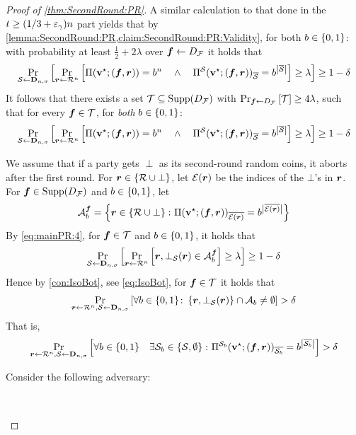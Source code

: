 \begin{proof}[Proof of \cref{thm:SecondRound:PR}]
A similar  calculation to that done in the  $t\ge (1/3 + \epg)n$ part  yields that by \cref{lemma:SecondRound:PR,claim:SecondRound:PR:Validity},  for both $\o\in \zo$:  with probability at least  $\frac12 + 2\lambda$ over  $\vf \gets \DF $ it holds that
\begin{align*}
\ppr{\cs \gets \bns}{\ppr{\vr \gets \rn}{\Pi(\vstar;(\vf,\vr)) = \o^n \qand \Pi^\cs(\vstar;(\vf,\vr))_\oS = \o^{\size{\oS}} } \ge  \lambda}\ge 1-\delta
\end{align*}
It follows that there exists a set $\cT \subseteq \SDF$ with $\ppr{\vf \gets \DF}{\cT}\ge 4\lambda$, such that  for every $\vf\in \cT$, for \emph{both} $\o\in \zo$:
\begin{align}\label{eq:mainPR:4}
\ppr{\cs \gets \bns}{\ppr{\vr \gets \rn}{\Pi(\vstar;(\vf,\vr)) = \o^n \qand \Pi^\cs(\vstar;(\vf,\vr))_\oS = \o^{\size{\oS}} } \ge \lambda}\ge 1-\delta
\end{align}

We  assume \wlg that if a party gets $\perp$ as its second-round random coins, it aborts after the first round. For $\vr \in \rbot$, let $ \cE(\vr)$ be the indices of the $\bot$'s in $\vr$. For $\vf \in \SDF$ and $\o \in \zo$, let
\begin{align}
\cA^\vf_\o = \set{\vr \in \rbot \colon \Pi(\vstar;(\vf,\vr))_{\overline{\cE(\vr)}} = \o^{\size{\overline{\cE(\vr)}}}}
\end{align}
By \cref{eq:mainPR:4},  for $\vf \in \cT$ and $\o\in \zo$, it holds that
\begin{align}
\ppr{\cs\gets \bns}{\ppr{\vr \gets \rn}{\vr,\bot_{\cS}(\vr) \in \cA^\vf_\o} \ge\lambda} \ge 1-\delta
\end{align}
Hence by \cref{con:IsoBot},  see  \cref{eq:IsoBot}, for  $\vf \in \cT$ it holds that
\begin{align*}
\ppr{\vr\gets \rn,\cS \gets \bns}{\forall \o \in \zo\colon   \set{\vr,\bot_{\cS}(\vr)}\cap \cA_b \neq \emptyset} > \delta
\end{align*}
That is,
\begin{align}\label{eq:PR:3}
\ppr{\vr\gets \cR^n,\cS \gets \bns}{\forall \o\in \zo  \quad \exists \cs_\o \in \set{\cs,\emptyset} \colon  \Pi^{\cS_\o}(\vstar;(\vf,\vr))_{\overline{\cS_\o}}= \o^{ \size{\overline{\cS_\o}}}} >\delta
\end{align}

{\samepage
	\noindent
	Consider the following adversary:
	
	\begin{algorithm}[$\Ac$]~
		

\end{algorithm}}
\end{proof}
